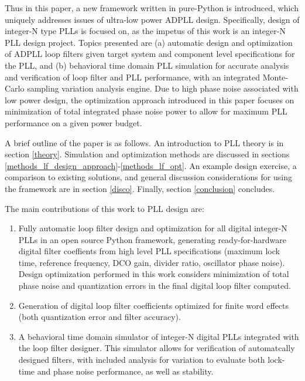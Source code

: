 Thus in this paper, a new framework written in pure-Python is introduced, which uniquely addresses issues of ultra-low power ADPLL design. Specifically, design of integer-N type PLLs is focused on, as the impetus of this work is an integer-N PLL design project. Topics presented are (a) automatic design and optimization of ADPLL loop filters given target system and component level specifications for the PLL, and (b) behavioral time domain PLL simulation for accurate analysis and verification of loop filter and PLL performance, with an integrated Monte-Carlo sampling variation analysis engine. Due to high phase noise associated with low power design, the optimization approach introduced in this paper focuses on minimization of total integrated phase noise power to allow for maximum PLL performance on a given power budget.

A brief outline of the paper is as follows. An introduction to PLL theory is in section \ref{theory}. Simulation and optimization methods are discussed in sections \ref{methods_lf_design_approach}-\ref{methods_lf_opt}. An example design exercise, a comparison to existing solutions, and general discussion considerations for using the framework are in section \ref{disco}. Finally, section \ref{conclusion} concludes.
\vspace{1em}

The main contributions of this work to PLL design are:
\vspace{-0.8em}
\begin{enumerate}[itemsep=0pt,label=\protect\mycirc{\arabic*}]
	\setlength\itemsep{-0.8em}
	\item Fully automatic loop filter design and optimization for all digital integer-N PLLs in an open source Python framework, generating ready-for-hardware digital filter coeffients from high level PLL specifications (maximum lock time, reference frequency, DCO gain, divider ratio, oscillator phase noise). Design optimization performed in this work considers minimization of total phase noise and quantization errors in the final digital loop filter computed.
	\item Generation of digital loop filter coefficients optimized for finite word effects (both quantization error and filter accuracy).
	\item A behavioral time domain simulator of integer-N digital PLLs integrated with the loop filter designer. This simulator allows for verification of automatcally designed filters, with included analysis for variation to evaluate both lock-time and phase noise performance, as well as stability.
\end{enumerate}
